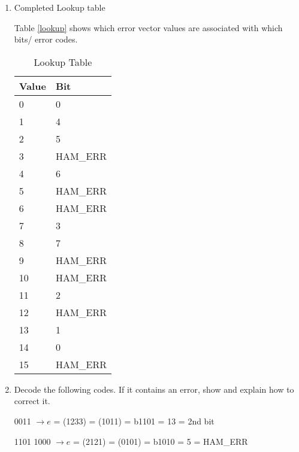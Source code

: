 \documentclass[12pt]{article}
\newenvironment{QandA}{\begin{enumerate}[label=\bfseries\alph*.]\bfseries}
{\end{enumerate}}
\newenvironment{answered}{\par\normalfont}{}
\begin{document}
\begin{QandA}

\item Completed Lookup table

    \begin{answered}

        Table \vref{lookup} shows which error vector values are associated with
        which bits/ error codes.

        \begin{table}[]
            \centering
            \begin{tabular}{l|l}
                \textbf{Value} & \textbf{Bit} \\ \hline
                0              & 0            \\
                1              & 4            \\
                2              & 5            \\
                3              & HAM\_ERR     \\
                4              & 6            \\
                5              & HAM\_ERR     \\
                6              & HAM\_ERR     \\
                7              & 3            \\
                8              & 7            \\
                9              & HAM\_ERR     \\
                10             & HAM\_ERR     \\
                11             & 2            \\
                12             & HAM\_ERR     \\
                13             & 1            \\
                14             & 0            \\
                15             & HAM\_ERR    
            \end{tabular}
            \caption{Lookup Table}\label{lookup}
        \end{table}

    \end{answered}

\item Decode the following codes. If it contains an error, show and explain
    how to correct it.

    \begin{answered}
        1110 0011 $\rightarrow e$ = (1233) = (1011) = b1101 = 13 = 2nd bit

        1101 1000 $\rightarrow e$ = (2121) = (0101) = b1010 = 5 = HAM\_ERR
    \end{answered}

\end{QandA}
\end{document}
